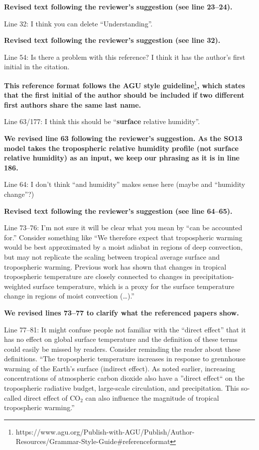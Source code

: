 \documentclass[11pt]{article}
\begin{document}
\textbf{Revised text following the reviewer's suggestion (see line 23--24).}

Line 32: I think you can delete ``Understanding''.

\textbf{Revised text following the reviewer's suggestion (see line 32).}

Line 54: Is there a problem with this reference? I think it has the author's first initial in the citation.

\textbf{This reference format follows the AGU style guideline}\footnote{https://www.agu.org/Publish-with-AGU/Publish/Author-Resources/Grammar-Style-Guide\#referenceformat}\textbf{, which states that the first initial of the author should be included if two different first authors share the same last name.}

Line 63/177: I think this should be ``\textbf{surface} relative humidity''.

\textbf{We revised line 63 following the reviewer's suggestion. As the SO13 model takes the tropospheric relative humidity profile (not surface relative humidity) as an input, we keep our phrasing as it is in line 186.}

Line 64: I don't think ``and humidity'' makes sense here (maybe and ``humidity change''?)

\textbf{Revised text following the reviewer's suggestion (see line 64--65).}

Line 73--76: I'm not sure it will be clear what you mean by ``can be accounted for.'' Consider something like ``We therefore expect that tropospheric warming would be best approximated by a moist adiabat in regions of deep convection, but may not replicate the scaling between tropical average surface and tropospheric warming. Previous work has shown that changes in tropical tropospheric temperature are closely connected to changes in precipitation-weighted surface temperature, which is a proxy for the surface temperature change in regions of moist convection (\ldots{}).''

\textbf{We revised lines 73--77 to clarify what the referenced papers show.}

Line 77--81: It might confuse people not familiar with the ``direct effect'' that it has no effect on global surface temperature and the definition of these terms could easily be missed by readers. Consider reminding the reader about these definitions. ``The tropospheric temperature increases in response to grennhouse warming of the Earth's surface (indirect effect). As noted earlier, increasing concentrations of atmospheric carbon dioxide also have a ''direct effect`` on the tropospheric radiative budget, large-scale circulation, and precipitation. This so-called direct effect of CO\(_2\) can also influence the magnitude of tropical tropospheric warming.''
\end{document}
